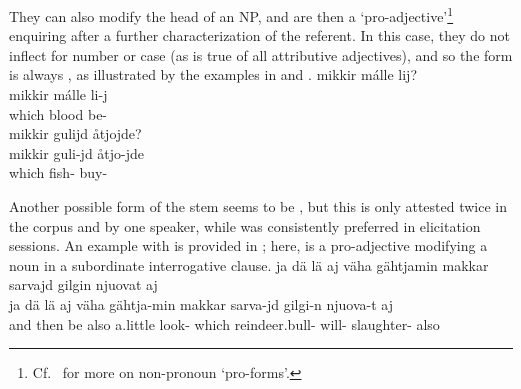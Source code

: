 They can also modify the head of an NP, and are then a ‘pro-adjective’\footnote{Cf.~\citet[31-34]{SchachterShopen2007} for more on non-pronoun ‘pro-forms’.} enquiring after a further characterization of the referent. In this case, they do not inflect for number or case (as is true of all attributive adjectives), and so the form is always , as illustrated by the examples in  and . %
\ea\label{QpronounDEMGeneralEx3}
\glll	mikkir málle lij?\\
	mikkir málle li-j\\
	which blood\BS{} be-\\\nopagebreak
{}	
\z
\ea\label{QpronounDEMGeneralEx4}
\glll	mikkir gulijd åtjojde?\\
	mikkir guli-jd åtjo-jde\\
	which fish- buy-\\\nopagebreak
{}	
\z

Another possible form of the stem seems to be , but this is only attested twice in the corpus and by one speaker, while  was consistently preferred in elicitation sessions. %
An example with  is provided in ; here,  is a pro-adjective modifying a noun in a subordinate interrogative clause. 
\ea\label{QpronounDEMGeneralEx5}
\glll	ja dä lä aj väha gähtjamin makkar sarvajd gilgin njuovat aj\\
	ja dä lä aj väha gähtja-min makkar sarva-jd gilgi-n njuova-t aj\\
	and then be\BS{} also a.little look- which reindeer.bull- will- slaughter- also\\\nopagebreak
{}	
\z



